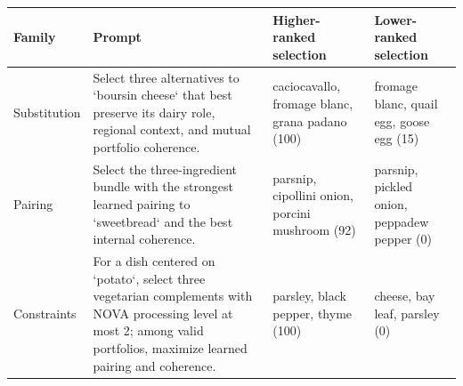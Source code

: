 \begin{tabularx}{\linewidth}{@{}l X X X@{}}
\toprule
Family & Prompt & Higher-ranked selection & Lower-ranked selection \\
\midrule
Substitution & Select three alternatives to `boursin cheese` that best preserve its dairy role, regional context, and mutual portfolio coherence. & caciocavallo, fromage blanc, grana padano (100) & fromage blanc, quail egg, goose egg (15) \\
Pairing & Select the three-ingredient bundle with the strongest learned pairing to `sweetbread` and the best internal coherence. & parsnip, cipollini onion, porcini mushroom (92) & parsnip, pickled onion, peppadew pepper (0) \\
Constraints & For a dish centered on `potato`, select three vegetarian complements with NOVA processing level at most 2; among valid portfolios, maximize learned pairing and coherence. & parsley, black pepper, thyme (100) & cheese, bay leaf, parsley (0) \\
\bottomrule
\end{tabularx}

